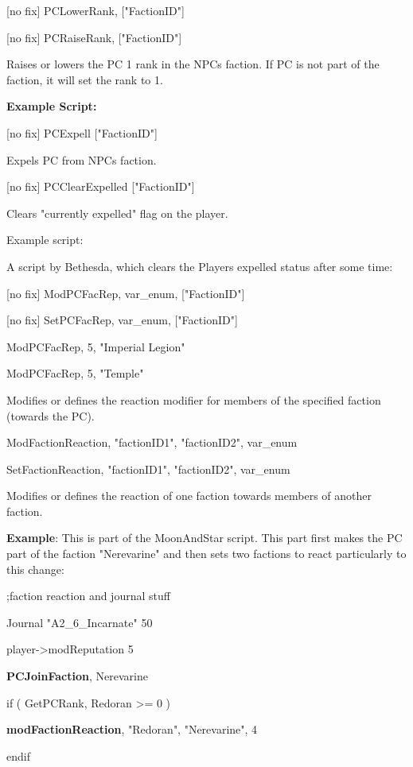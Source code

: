 {[}no fix{]} PCLowerRank, {[}"FactionID"{]}

{[}no fix{]} PCRaiseRank, {[}"FactionID"{]}

Raises or lowers the PC 1 rank in the NPCs faction. If PC is not part of
the faction, it will set the rank to 1.

\textbf{Example Script:}



{[}no fix{]} PCExpell {[}"FactionID"{]}

Expels PC from NPCs faction.

{[}no fix{]} PCClearExpelled {[}"FactionID"{]}

Clears "currently expelled" flag on the player.

Example script:

A script by Bethesda, which clears the Players expelled status after
some time:



{[}no fix{]} ModPCFacRep, var\_enum, {[}"FactionID"{]}

{[}no fix{]} SetPCFacRep, var\_enum, {[}"FactionID"{]}

ModPCFacRep, 5, "Imperial Legion"

ModPCFacRep, 5, "Temple"

Modifies or defines the reaction modifier for members of the specified
faction (towards the PC).

ModFactionReaction, "factionID1", "factionID2", var\_enum

SetFactionReaction, "factionID1", "factionID2", var\_enum

Modifies or defines the reaction of one faction towards members of
another faction.

\textbf{Example}: This is part of the MoonAndStar script. This part
first makes the PC part of the faction "Nerevarine" and then sets two
factions to react particularly to this change:

;faction reaction and journal stuff

Journal "A2\_6\_Incarnate" 50

player-\textgreater modReputation 5

\textbf{PCJoinFaction}, Nerevarine

if ( GetPCRank, Redoran \textgreater= 0 )

\textbf{modFactionReaction}, "Redoran", "Nerevarine", 4

endif

